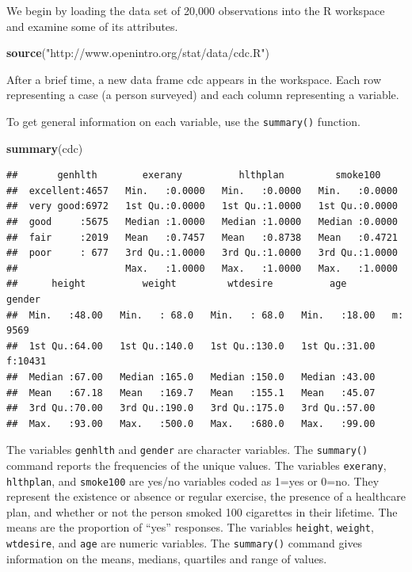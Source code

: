\documentclass[
]{book}
\newenvironment{Shaded}{\begin{snugshade}}{\end{snugshade}}
\newcommand{\KeywordTok}[1]{\textcolor[rgb]{0.13,0.29,0.53}{\textbf{#1}}}
\newcommand{\NormalTok}[1]{#1}
\newcommand{\StringTok}[1]{\textcolor[rgb]{0.31,0.60,0.02}{#1}}
\begin{document}
We begin by loading the data set of 20,000 observations into the R workspace and examine some of its attributes.

\begin{Shaded}
\begin{Highlighting}[]
\KeywordTok{source}\NormalTok{(}\StringTok{"http://www.openintro.org/stat/data/cdc.R"}\NormalTok{)}
\end{Highlighting}
\end{Shaded}

After a brief time, a new data frame cdc appears in the workspace. Each row representing a case (a person surveyed) and each column representing a variable.

To get general information on each variable, use the \texttt{summary()} function.

\begin{Shaded}
\begin{Highlighting}[]
\KeywordTok{summary}\NormalTok{(cdc)}
\end{Highlighting}
\end{Shaded}

\begin{verbatim}
##       genhlth        exerany          hlthplan         smoke100     
##  excellent:4657   Min.   :0.0000   Min.   :0.0000   Min.   :0.0000  
##  very good:6972   1st Qu.:0.0000   1st Qu.:1.0000   1st Qu.:0.0000  
##  good     :5675   Median :1.0000   Median :1.0000   Median :0.0000  
##  fair     :2019   Mean   :0.7457   Mean   :0.8738   Mean   :0.4721  
##  poor     : 677   3rd Qu.:1.0000   3rd Qu.:1.0000   3rd Qu.:1.0000  
##                   Max.   :1.0000   Max.   :1.0000   Max.   :1.0000  
##      height          weight         wtdesire          age        gender   
##  Min.   :48.00   Min.   : 68.0   Min.   : 68.0   Min.   :18.00   m: 9569  
##  1st Qu.:64.00   1st Qu.:140.0   1st Qu.:130.0   1st Qu.:31.00   f:10431  
##  Median :67.00   Median :165.0   Median :150.0   Median :43.00            
##  Mean   :67.18   Mean   :169.7   Mean   :155.1   Mean   :45.07            
##  3rd Qu.:70.00   3rd Qu.:190.0   3rd Qu.:175.0   3rd Qu.:57.00            
##  Max.   :93.00   Max.   :500.0   Max.   :680.0   Max.   :99.00
\end{verbatim}

The variables \texttt{genhlth} and \texttt{gender} are character variables. The \texttt{summary()} command reports the frequencies of the unique values. The variables \texttt{exerany}, \texttt{hlthplan}, and \texttt{smoke100} are yes/no variables coded as 1=yes or 0=no. They represent the existence or absence or regular exercise, the presence of a healthcare plan, and whether or not the person smoked 100 cigarettes in their lifetime. The means are the proportion of ``yes'' responses. The variables \texttt{height}, \texttt{weight}, \texttt{wtdesire}, and \texttt{age} are numeric variables. The \texttt{summary()} command gives information on the means, medians, quartiles and range of values.
\end{document}
